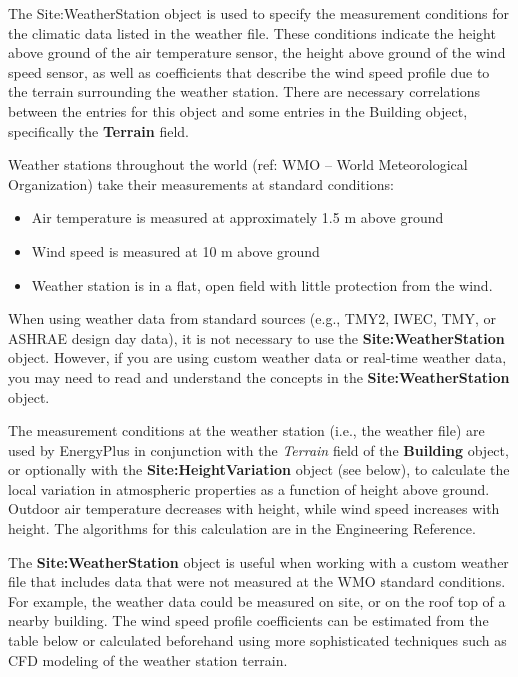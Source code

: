 The Site:WeatherStation object is used to specify the measurement conditions for the climatic data listed in the weather file. These conditions indicate the height above ground of the air temperature sensor, the height above ground of the wind speed sensor, as well as coefficients that describe the wind speed profile due to the terrain surrounding the weather station. There are necessary correlations between the entries for this object and some entries in the Building object, specifically the \textbf{Terrain} field.

Weather stations throughout the world (ref: WMO -- World Meteorological Organization) take their measurements at standard conditions:

\begin{itemize}
\item
  Air temperature is measured at approximately 1.5 m above ground
\item
  Wind speed is measured at 10 m above ground
\item
  Weather station is in a flat, open field with little protection from the wind.
\end{itemize}

When using weather data from standard sources (e.g., TMY2, IWEC, TMY, or ASHRAE design day data), it is not necessary to use the \textbf{Site:WeatherStation} object. However, if you are using custom weather data or real-time weather data, you may need to read and understand the concepts in the \textbf{Site:WeatherStation} object.

The measurement conditions at the weather station (i.e., the weather file) are used by EnergyPlus in conjunction with the \emph{Terrain} field of the \textbf{Building} object, or optionally with the \textbf{Site:HeightVariation} object (see below), to calculate the local variation in atmospheric properties as a function of height above ground. Outdoor air temperature decreases with height, while wind speed increases with height. The algorithms for this calculation are in the Engineering Reference.

The \textbf{Site:WeatherStation} object is useful when working with a custom weather file that includes data that were not measured at the WMO standard conditions. For example, the weather data could be measured on site, or on the roof top of a nearby building. The wind speed profile coefficients can be estimated from the table below or calculated beforehand using more sophisticated techniques such as CFD modeling of the weather station terrain.

